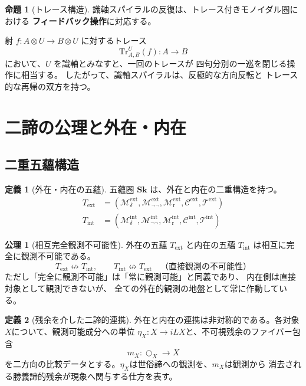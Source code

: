 \documentclass[11pt,a4paper]{ltjsarticle}
\theoremstyle{definition}
\newtheorem{definition}{定義}[section]
\newtheorem{axiom}{公理}[section]
\newtheorem{proposition}{命題}[section]
\newcommand{\Sk}{\mathbf{Sk}}
\newcommand{\Mdelta}{\mathcal{M}_{\delta}}
\newcommand{\Mneg}{\mathcal{M}_{\neg\neg}}
\newcommand{\Mr}{\mathcal{M}_{\mathrm{r}}}
\newcommand{\Mc}{\mathcal{C}}
\newcommand{\T}{\mathcal{T}}
\newcommand{\trace}{\mathrm{Tr}}
\newcommand{\ext}{\mathrm{ext}}
\newcommand{\intn}{\mathrm{int}}
\newcommand{\TExt}{T_{\ext}}
\newcommand{\TInt}{T_{\intn}}
\begin{document}
\begin{proposition}[トレース構造]
識軸スパイラルの反復は、トレース付きモノイダル圏における
\textbf{フィードバック操作}に対応する。

射 $f : A \otimes U \to B \otimes U$ に対するトレース
\begin{equation}
\trace^U_{A,B}(f) : A \to B
\end{equation}
において、$U$ を識軸とみなすと、一回のトレースが
四句分別の一巡を閉じる操作に相当する。
したがって、識軸スパイラルは、反極的な方向反転と
トレース的な再帰の双方を持つ。
\end{proposition}

\section{二諦の公理と外在・内在}

\subsection{二重五蘊構造}

\begin{definition}[外在・内在の五蘊]
五蘊圏 $\Sk$ は、外在と内在の二重構造を持つ。
\begin{align}
\TExt &= (\Mdelta^{\ext}, \Mneg^{\ext}, \Mr^{\ext}, \Mc^{\ext}, \T^{\ext}) \\
\TInt &= (\Mdelta^{\intn}, \Mneg^{\intn}, \Mr^{\intn}, \Mc^{\intn}, \T^{\intn})
\end{align}
\end{definition}

\begin{axiom}[相互完全観測不可能性]
外在の五蘊 $\TExt$ と内在の五蘊 $\TInt$ は相互に完全に観測不可能である。
\begin{equation}
\TExt \not\leftrightarrow \TInt, \qquad
\TInt \not\leftrightarrow \TExt \quad \text{（直接観測の不可能性）}
\end{equation}
ただし「完全に観測不可能」は「常に観測可能」と同義であり、
内在側は直接対象として観測できないが、
全ての外在的観測の地盤として常に作動している。
\end{axiom}

\begin{definition}[残余を介した二諦的連携]
外在と内在の連携は非対称的である。各対象$X$について、観測可能成分への単位
$\eta_X:X\to iLX$と、不可視残余のファイバー包含
\[
 m_X:\bigcirc_X\longrightarrow X
\]
を二方向の比較データとする。$\eta_X$は世俗諦への観測を、$m_X$は観測から
消去される勝義諦的残余が現象へ関与する仕方を表す。
\end{definition}
\end{document}
